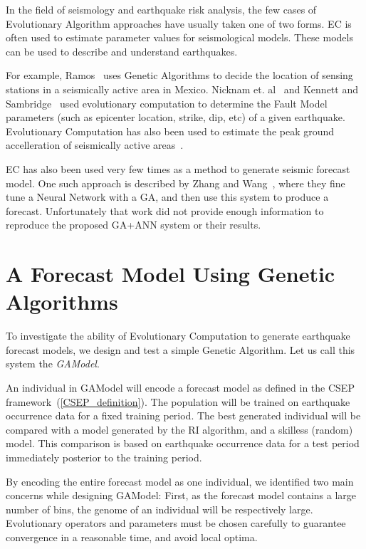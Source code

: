 \documentclass{sig-alternate}
\begin{document}
In the field of seismology and earthquake risk analysis, the few cases
of Evolutionary Algorithm approaches have usually taken one of two
forms. EC is often used to estimate parameter values for seismological
models.  These models can be used to describe and understand
earthquakes.

For example, Ramos~\cite{Ramos2011} uses Genetic Algorithms to decide
the location of sensing stations in a seismically active area in
Mexico. Nicknam et. al~\cite{Nicknam2010} and Kennett and
Sambridge~\cite{Kennett1992} used evolutionary computation to
determine the Fault Model parameters (such as epicenter location,
strike, dip, etc) of a given earthquake. Evolutionary Computation has
also been used to estimate the peak ground accelleration of
seismically active areas~\cite{Kermani2009, Cabalar2009}.

EC has also been used very few times as a method to generate seismic
forecast model. One such approach is described by Zhang and
Wang~\cite{Zhang2012}, where they fine tune a Neural Network with a
GA, and then use this system to produce a forecast. Unfortunately that
work did not provide enough information to reproduce the proposed
GA+ANN system or their results.

\section{A Forecast Model Using Genetic Algorithms} %

To investigate the ability of Evolutionary Computation to generate
earthquake forecast models, we design and test a simple Genetic
Algorithm. Let us call this system the \emph{GAModel}.

An individual in GAModel will encode a forecast model as defined in
the CSEP framework~(\ref{CSEP_definition}). The population will be
trained on earthquake occurrence data for a fixed training period. The
best generated individual will be compared with a model generated by
the RI algorithm, and a skilless (random) model. This comparison is
based on earthquake occurrence data for a test period immediately
posterior to the training period.

By encoding the entire forecast model as one individual, we identified
two main concerns while designing GAModel: First, as the forecast
model contains a large number of bins, the genome of an individual
will be respectively large. Evolutionary operators and parameters must
be chosen carefully to guarantee convergence in a reasonable time, and
avoid local optima.
\end{document}
